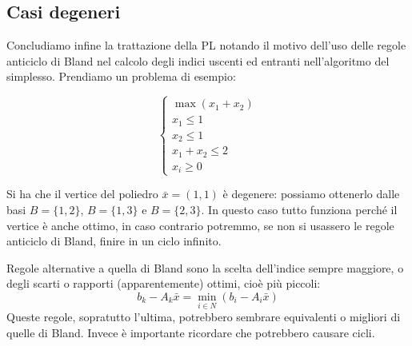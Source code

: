 \documentclass[a4paper,11pt]{article}
\begin{document}
\subsection{Casi degeneri}
Concludiamo infine la trattazione della PL notando il motivo dell'uso delle regole anticiclo di Bland nel calcolo degli indici uscenti ed entranti nell'algoritmo del simplesso.
Prendiamo un problema di esempio:

\[
	\begin{cases}
		\max(x_1 + x_2) \\ 
		x_1 \leq 1 \\ 
		x_2 \leq 1 \\ 
		x_1 + x_2 \leq 2 \\ 
		x_i \geq 0
	\end{cases}
\]

Si ha che il vertice del poliedro $\bar{x} = (1,1)$ è degenere: possiamo ottenerlo dalle basi $B = \{ 1, 2 \}$, $B = \{ 1, 3 \}$ e $B = \{ 2, 3\}$.
In questo caso tutto funziona perché il vertice è anche ottimo, in caso contrario potremmo, se non si usassero le regole anticiclo di Bland, finire in un ciclo infinito.

Regole alternative a quella di Bland sono la scelta dell'indice sempre maggiore, o degli scarti o rapporti (apparentemente) ottimi, cioè più piccoli:
$$
b_k - A_k \bar{x} = \min_{i \in N}\left( b_i - A_i \bar{x} \right)
$$
Queste regole, sopratutto l'ultima, potrebbero sembrare equivalenti o migliori di quelle di Bland.
Invece è importante ricordare che potrebbero causare cicli.
\end{document}
